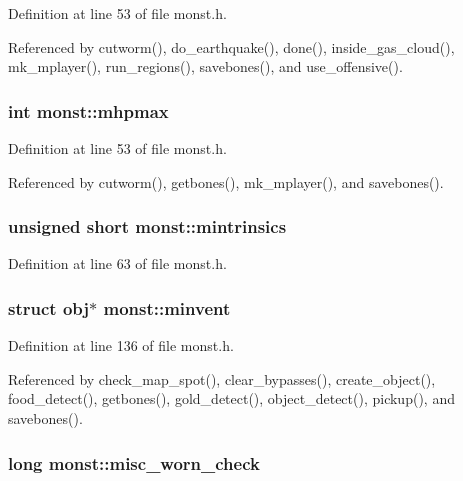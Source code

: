 Definition at line 53 of file monst.\+h.



Referenced by cutworm(), do\+\_\+earthquake(), done(), inside\+\_\+gas\+\_\+cloud(), mk\+\_\+mplayer(), run\+\_\+regions(), savebones(), and use\+\_\+offensive().

\hypertarget{structmonst_a66c107319bb7bb318c04e6a0f5f03c60}{
\subsubsection[{mhpmax}]{\setlength{\rightskip}{0pt plus 5cm}int monst\+::mhpmax}}\label{structmonst_a66c107319bb7bb318c04e6a0f5f03c60}


Definition at line 53 of file monst.\+h.



Referenced by cutworm(), getbones(), mk\+\_\+mplayer(), and savebones().

\hypertarget{structmonst_a75e177403095d3c7ce5636d6d20ed725}{
\subsubsection[{mintrinsics}]{\setlength{\rightskip}{0pt plus 5cm}unsigned short monst\+::mintrinsics}}\label{structmonst_a75e177403095d3c7ce5636d6d20ed725}


Definition at line 63 of file monst.\+h.

\hypertarget{structmonst_a480856d6a5db5610593c9816e525a978}{
\subsubsection[{minvent}]{\setlength{\rightskip}{0pt plus 5cm}struct {\bf obj}$\ast$ monst\+::minvent}}\label{structmonst_a480856d6a5db5610593c9816e525a978}


Definition at line 136 of file monst.\+h.



Referenced by check\+\_\+map\+\_\+spot(), clear\+\_\+bypasses(), create\+\_\+object(), food\+\_\+detect(), getbones(), gold\+\_\+detect(), object\+\_\+detect(), pickup(), and savebones().

\hypertarget{structmonst_afc2bd39e2f3e797e15bea20ac7f69788}{
\subsubsection[{misc\+\_\+worn\+\_\+check}]{\setlength{\rightskip}{0pt plus 5cm}long monst\+::misc\+\_\+worn\+\_\+check}}\label{structmonst_afc2bd39e2f3e797e15bea20ac7f69788}


